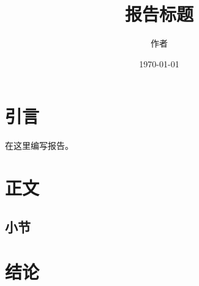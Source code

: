 \documentclass[UTF8]{ctexrep}
\title{报告标题}
\author{作者}
\date{\today}
\begin{document}
\maketitle
\tableofcontents

\chapter{引言}

在这里编写报告。

\chapter{正文}

\section{小节}

\chapter{结论}
\end{document}
